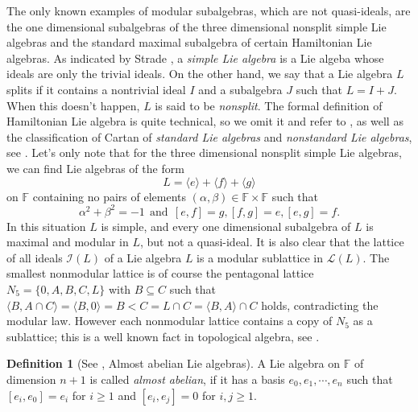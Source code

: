 \documentclass{amsart}
\theoremstyle{definition}
\newtheorem{definition}[theorem]{Definition}
\numberwithin{equation}{section}
\begin{document}
The only  known examples of modular subalgebras, which are not quasi-ideals, are the one dimensional subalgebras of the three dimensional nonsplit simple Lie algebras and the standard maximal subalgebra of certain Hamiltonian Lie algebras. As indicated by Strade \cite{strade1}, a \textit{simple Lie algebra} is a Lie algeba whose ideals are only the trivial ideals.  On the other hand, we say that a Lie algebra $L$ splits if it contains a nontrivial ideal $I$ and a subalgebra $J$ such that $L=I +J$. When this doesn't happen, $L$ is said to be \textit{nonsplit}. The formal definition of Hamiltonian Lie algebra is quite technical, so we omit it and refer to \cite[\S 4.2]{strade1}, as well as the classification of Cartan of \textit{standard Lie algebras} and \textit{nonstandard Lie algebras}, see \cite{strade1}. Let's only note  that for the three dimensional nonsplit simple Lie algebras, we can find Lie algebras of the form   $$L=\langle e\rangle + \langle f\rangle  + \langle g\rangle$$ on $\mathbb{F}$ containing no pairs of elements $(\alpha, \beta) \in \mathbb{F} \times \mathbb{F}$ such
that $$\alpha^2 +\beta^2=-1  \  \ \mbox{and} \ \  [e,f]=g, [f,g]=e, [e,g]=f.$$ In this situation  $L$ is simple, and every one dimensional subalgebra of $L$ is maximal and modular in $L$, but not a quasi-ideal.
It is also clear that the lattice of all ideals $\mathcal{I}(L)$ of a Lie algebra $L$ is a modular sublattice in $ \mathcal{L}(L)$. The smallest nonmodular lattice is of course the pentagonal lattice $N_5=\{0, A,B,C, L\}$ with $B \subseteq C $  such that
$\langle B,A\cap C \rangle= \langle B, 0 \rangle=B < C=L\cap C= \langle B,A \rangle \cap C $
holds, contradicting the modular law. However each nonmodular lattice contains a copy of $N_5$ as a sublattice; this is a well known fact in topological algebra, see \cite{hhr, rs}.

\begin{definition} [See \cite {kolman1965}, Almost abelian Lie algebras]\label{almostabelian}
A  Lie algebra on $\mathbb{F}$ of dimension $n+1$ is called \textit{almost abelian}, if it has a basis $e_0, e_1, \cdots, e_n$ such that $[e_i,e_0]=e_i$ for $i\geq 1$ and $[e_i,e_j]=0$ for  $i, j\geq 1$. 
\end{definition}
\end{document}
